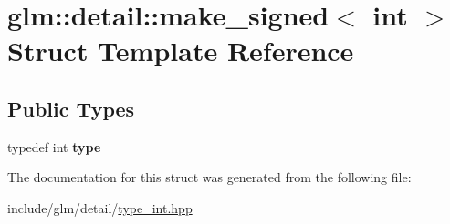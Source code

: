 \hypertarget{structglm_1_1detail_1_1make__signed_3_01int_01_4}{}\section{glm\+:\+:detail\+:\+:make\+\_\+signed$<$ int $>$ Struct Template Reference}
\label{structglm_1_1detail_1_1make__signed_3_01int_01_4}
\subsection*{Public Types}
\begin{DoxyCompactItemize}
\item 
\mbox{\label{structglm_1_1detail_1_1make__signed_3_01int_01_4_a69085e97a5044d1985cdc2116eb6ea9b}} 
typedef int {\bfseries type}
\end{DoxyCompactItemize}


The documentation for this struct was generated from the following file\+:\begin{DoxyCompactItemize}
\item 
include/glm/detail/\hyperlink{type__int_8hpp}{type\+\_\+int.\+hpp}\end{DoxyCompactItemize}
